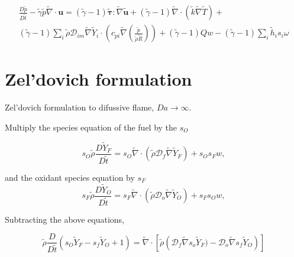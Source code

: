 \documentclass[preprint,12pt,authoryear]{elsarticle}
\begin{document}
\begin{equation}
\begin{split}
        \frac{D \tilde{p}}{D\tilde{t}}
	-
	\tilde{\gamma}
	\tilde{p} 
	\tilde{\nabla}\cdot{\mathbf{u}}
        =
	(\tilde{\gamma}-1)
        \pmb{\tilde{\tau}}:\tilde{\nabla} \tilde{\mathbf{u}} 
        + 
	(\tilde{\gamma}-1)
        \tilde{\nabla} \cdot (\tilde{k}\tilde{\nabla} \tilde{T})
        +
	\\
	(\tilde{\gamma}-1)
        \sum\limits_i 
        \tilde{\rho}
        \mathcal{D}_{im}
        \tilde{\nabla}
        \tilde{Y}_i     
        \cdot
        \left(
                c_{pi}
                \tilde{\nabla}
                \left(
                	\frac{\tilde{p}}{\tilde{\rho}\tilde{R}}
                \right)
        \right)
	+
	(\tilde{\gamma}-1)
	Qw
	-
	(\tilde{\gamma}-1)
        \sum\limits_i
	\tilde{h}_i
        s_i \omega	
\end{split}
\end{equation}


\section{Zel'dovich formulation}

Zel'dovich formulation to difussive  flame, $Da\to \infty$.

Multiply the species equation of the fuel by the $s_O$ 

\begin{equation}
	s_O
	\tilde{\rho} \frac{D  \tilde{Y}_F }{D \tilde{t}}
= 
	s_O
	\tilde{\nabla}\cdot( \tilde{\rho} \mathcal{D}_f\tilde{\nabla} \tilde{Y}_F)
	+
	s_O
        s_F w,
\label{eqYF}
\end{equation}


and the oxidant species equation by $s_F$ 
\begin{equation}
	s_F
	\tilde{\rho} \frac{D  \tilde{Y}_O }{D \tilde{t}}
= 
	s_F
	\tilde{\nabla}\cdot( \tilde{\rho} \mathcal{D}_o\tilde{\nabla} 
	\tilde{Y}_O
	)
	+
	s_F
    	s_O 
	w,
\label{eqYO}
\end{equation}


Subtracting  the above equations,

\begin{equation}
	\tilde{\rho} \frac{D  }{D \tilde{t}} 
	(s_O \tilde{Y}_F - s_f \tilde{Y}_O + 1) 
= 
	\tilde{\nabla}
	\cdot
	\left[
		\tilde{\rho} 
		\left( 
			\mathcal{D}_f\tilde{\nabla} s_o \tilde{Y}_F)
			-
		    \mathcal{D}_o\tilde{\nabla} {s_f \tilde{Y}_O}
		\right) 
	\right] 
\end{equation}
\end{document}
